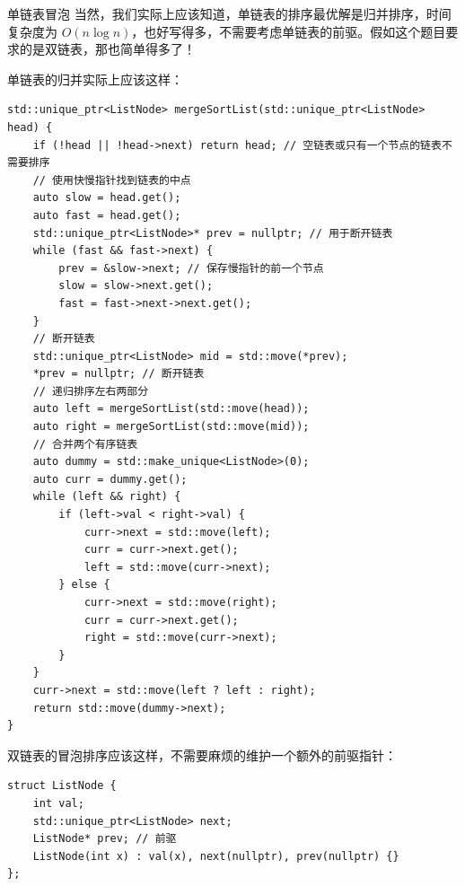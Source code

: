 \begin{example}{单链表冒泡}{}
    当然，我们实际上应该知道，单链表的排序最优解是归并排序，时间复杂度为 $O(n \log n)$，也好写得多，不需要考虑单链表的前驱。假如这个题目要求的是双链表，那也简单得多了！

    单链表的归并实际上应该这样：
    \begin{verbatim}
std::unique_ptr<ListNode> mergeSortList(std::unique_ptr<ListNode> head) {
    if (!head || !head->next) return head; // 空链表或只有一个节点的链表不需要排序
    // 使用快慢指针找到链表的中点
    auto slow = head.get();
    auto fast = head.get();
    std::unique_ptr<ListNode>* prev = nullptr; // 用于断开链表
    while (fast && fast->next) {
        prev = &slow->next; // 保存慢指针的前一个节点
        slow = slow->next.get();
        fast = fast->next->next.get();
    }
    // 断开链表
    std::unique_ptr<ListNode> mid = std::move(*prev);
    *prev = nullptr; // 断开链表
    // 递归排序左右两部分
    auto left = mergeSortList(std::move(head));
    auto right = mergeSortList(std::move(mid));
    // 合并两个有序链表
    auto dummy = std::make_unique<ListNode>(0);
    auto curr = dummy.get();
    while (left && right) {
        if (left->val < right->val) {
            curr->next = std::move(left);
            curr = curr->next.get();
            left = std::move(curr->next);
        } else {
            curr->next = std::move(right);
            curr = curr->next.get();
            right = std::move(curr->next);
        }
    }
    curr->next = std::move(left ? left : right);
    return std::move(dummy->next);
}
    \end{verbatim}

    双链表的冒泡排序应该这样，不需要麻烦的维护一个额外的前驱指针：
    \begin{verbatim}
struct ListNode {
    int val;
    std::unique_ptr<ListNode> next; 
    ListNode* prev; // 前驱
    ListNode(int x) : val(x), next(nullptr), prev(nullptr) {}
};


\end{verbatim}
\end{example}
